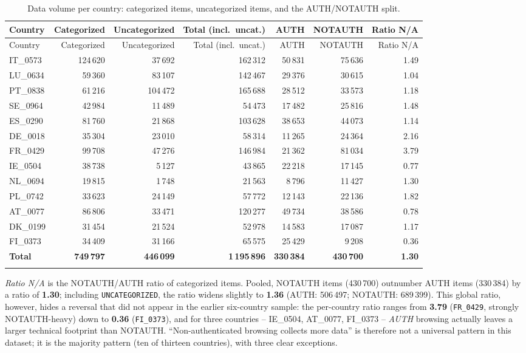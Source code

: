 \documentclass[11pt,a4paper]{article}
\newcommand{\code}[1]{\texttt{#1}}
\begin{document}
\begingroup\footnotesize\setlength{\tabcolsep}{4pt}
\begin{longtable}{lrrrrrr}
\caption{Data volume per country: categorized items, uncategorized items, and the AUTH/NOTAUTH split.}\label{tab:volume}\\
\toprule
Country & Categorized & Uncategorized & Total (incl.\ uncat.) & AUTH & NOTAUTH & Ratio N/A \\
\midrule
\endfirsthead
\toprule
Country & Categorized & Uncategorized & Total (incl.\ uncat.) & AUTH & NOTAUTH & Ratio N/A \\
\midrule
\endhead
IT\_0573 & 124\,620 & 37\,692 & 162\,312 & 50\,831 & 75\,636 & 1.49 \\
LU\_0634 & 59\,360 & 83\,107 & 142\,467 & 29\,376 & 30\,615 & 1.04 \\
PT\_0838 & 61\,216 & 104\,472 & 165\,688 & 28\,512 & 33\,573 & 1.18 \\
SE\_0964 & 42\,984 & 11\,489 & 54\,473 & 17\,482 & 25\,816 & 1.48 \\
ES\_0290 & 81\,760 & 21\,868 & 103\,628 & 38\,653 & 44\,073 & 1.14 \\
DE\_0018 & 35\,304 & 23\,010 & 58\,314 & 11\,265 & 24\,364 & 2.16 \\
FR\_0429 & 99\,708 & 47\,276 & 146\,984 & 21\,362 & 81\,034 & 3.79 \\
IE\_0504 & 38\,738 & 5\,127 & 43\,865 & 22\,218 & 17\,145 & 0.77 \\
NL\_0694 & 19\,815 & 1\,748 & 21\,563 & 8\,796 & 11\,427 & 1.30 \\
PL\_0742 & 33\,623 & 24\,149 & 57\,772 & 12\,143 & 22\,136 & 1.82 \\
AT\_0077 & 86\,806 & 33\,471 & 120\,277 & 49\,734 & 38\,586 & 0.78 \\
DK\_0199 & 31\,454 & 21\,524 & 52\,978 & 14\,583 & 17\,087 & 1.17 \\
FI\_0373 & 34\,409 & 31\,166 & 65\,575 & 25\,429 & 9\,208 & 0.36 \\
\midrule
\textbf{Total} & \textbf{749\,797} & \textbf{446\,099} & \textbf{1\,195\,896} & \textbf{330\,384} & \textbf{430\,700} & \textbf{1.30} \\\\
\bottomrule
\end{longtable}
\endgroup

\noindent\emph{Ratio N/A} is the NOTAUTH/AUTH ratio of categorized items.
Pooled, NOTAUTH items (430\,700) outnumber AUTH items
(330\,384) by a ratio of \textbf{1.30}; including
\code{UNCATEGORIZED}, the ratio widens slightly to \textbf{1.36}
(AUTH: 506\,497; NOTAUTH: 689\,399). This global ratio, however,
hides a reversal that did not appear in the earlier six-country sample: the
per-country ratio ranges from \textbf{3.79} (\code{FR\_0429}, strongly
NOTAUTH-heavy) down to \textbf{0.36} (\code{FI\_0373}), and for three
countries -- IE\_0504, AT\_0077, FI\_0373 -- \emph{AUTH} browsing actually leaves a
larger technical footprint than NOTAUTH. ``Non-authenticated browsing collects
more data'' is therefore not a universal pattern in this dataset; it is the
majority pattern (ten of thirteen countries), with three clear exceptions.
\end{document}
